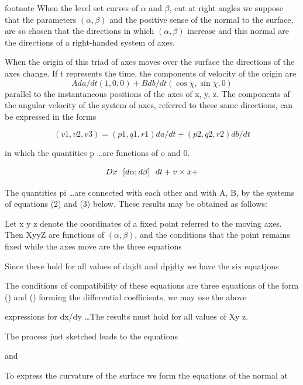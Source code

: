 footnote When the level set curves of \(\alpha \) and \(\beta \),
cut at right angles we suppose that the parameters
\((\alpha ,\beta) \)  and the positive sense of the normal to the surface, are
so chosen that the directions in which
\((\alpha ,\beta) \)  increase and this normal are the directions of a
right-handed system of axes.


When the origin of this triad of axes moves over the surface the directions of
the axes change. If
t represents the time, the components of velocity of the origin are
\[
A da/dt (1,0,0) +  B db/dt ( \cos \chi, \sin \chi, 0 )
\]
parallel to the instantaneous positions of the axes of
x, y, z. The components
af the angular velocity of the system of axes, referred to these same directions,
can be expressed in the forms

\[
(v1, v2, v3) = (p1,q1,r1) da/dt + (p2,q2,r2) db/dt
\]


in which the quantities p \dots are functions of o and 0.

\[
Dx ~~ [d \alpha; d \beta] ~~dt +  {v} \times {x} +
\]

The quantities pi \ldots are connected with each other and with A, B,  by
the systems of equations (2) and (3) below. These results may be obtained
as follows:

 Let
x y z
denote the coordinates of a fixed point referred to the moving axes. Then
XyyZ
are functions of
\((\alpha ,\beta) \), and the conditions that the point remains fixed while the
axes move are the three equations


Since these hold for all values of dajdt and dpjdty we have the six equatjons

 The conditions of compatibility of these equations are three equations of the form
 () and ()  forming the differential coefficients, we may use the above

expressions for dx/dy \ldots The results must hold for all values of Xy z.

 The process just sketched leads to the equations

and

To express the curvature of the surface we form the equations of the
normal at

